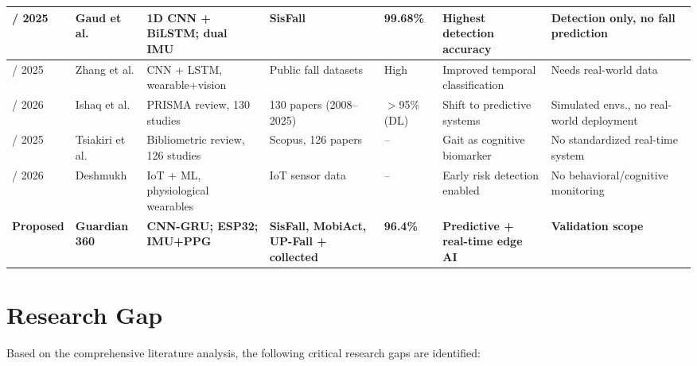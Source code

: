 \documentclass[conference]{IEEEtran}
\begin{document}
\begin{table}[!t]
\begin{tabular}{|p{1.8cm}|p{1.6cm}|p{2.4cm}|p{1.8cm}|p{1.4cm}|p{2.2cm}|p{2.4cm}|}
\hline
\cite{gaud2025} / 2025 & Gaud et al. & 1D CNN + BiLSTM; dual IMU & SisFall & 99.68\% & Highest detection accuracy & Detection only, no fall prediction \\
\hline
\cite{zhang2025} / 2025 & Zhang et al. & CNN + LSTM, wearable+vision & Public fall datasets & High & Improved temporal classification & Needs real-world data \\
\hline
\cite{ishaq2026} / 2026 & Ishaq et al. & PRISMA review, 130 studies & 130 papers (2008--2025) & $>$95\% (DL) & Shift to predictive systems & Simulated envs., no real-world deployment \\
\hline
\cite{tsiakiri2025} / 2025 & Tsiakiri et al. & Bibliometric review, 126 studies & Scopus, 126 papers & -- & Gait as cognitive biomarker & No standardized real-time system \\
\hline
\cite{deshmukh2026} / 2026 & Deshmukh & IoT + ML, physiological wearables & IoT sensor data & -- & Early risk detection enabled & No behavioral/cognitive monitoring \\
\hline
\textbf{Proposed} & \textbf{Guardian 360} & \textbf{CNN-GRU; ESP32; IMU+PPG} & \textbf{SisFall, MobiAct, UP-Fall + collected} & \textbf{96.4\%} & \textbf{Predictive + real-time edge AI} & \textbf{Validation scope} \\
\hline
\end{tabular}
\end{table}

\section{Research Gap}

Based on the comprehensive literature analysis, the following critical research gaps are identified:
\end{document}
